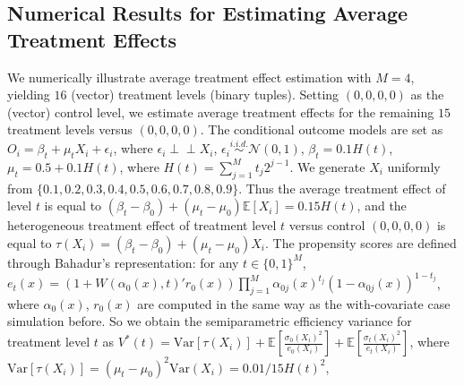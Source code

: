 \documentclass[11pt]{article}
\newcommand{\indep}{\perp\!\!\!\perp}
\begin{document}
\subsection{Numerical Results for Estimating Average Treatment Effects}\label{appendix:ATE:numerical}
We numerically illustrate average treatment effect estimation with $M=4$, yielding $16$ (vector) treatment levels (binary tuples). Setting $(0,0,0,0)$ as the (vector) control level, we estimate average treatment effects for the remaining $15$ treatment levels versus $(0,0,0,0)$. The conditional outcome models are set as $O_i=\beta_t+\mu_t X_i+\epsilon_i$, where $\epsilon_i\indep X_i$, $\epsilon_i\overset{i.i.d.}{\sim}\mathcal{N}(0,1)$, $\beta_t=0.1H(t)$, $\mu_t=0.5+0.1H(t)$, where $H(t)=\sum_{j=1}^Mt_j2^{j-1}$. We generate $X_i$ uniformly from $\{0.1,0.2,0.3,0.4,0.5,0.6,0.7,0.8,0.9\}$.
Thus the average treatment effect of level $t$ is equal to $(\beta_t-\beta_0)+(\mu_t-\mu_0)\mathbb{E}[X_i]=0.15H(t)$, and the heterogeneous treatment effect of treatment level $t$ versus control $(0,0,0,0)$ is equal to $\tau(X_i)=(\beta_t-\beta_0)+(\mu_t-\mu_0)X_i$. The propensity scores are defined through Bahadur's representation: for any $t\in\{0,1\}^M$, $e_t(x)=(1+W(\alpha_0(x),t)'r_0(x))\prod_{j=1}^M\alpha_{0j}(x)^{t_j}(1-\alpha_{0j}(x))^{1-t_j}$, where $\alpha_{0}(x)$, $r_0(x)$ are computed in the same way as the with-covariate case simulation before. So we obtain the semiparametric efficiency variance for treatment level $t$ as $V^*(t)=\mathrm{Var}[\tau(X_i)]+\mathbb{E}\left[\frac{\sigma_0(X_i)^2}{e_{0}(X_i)}\right]+\mathbb{E}\left[\frac{\sigma_t(X_i)^2}{e_t(X_i)}\right]$, where $\mathrm{Var}[\tau(X_i)]=(\mu_t-\mu_0)^2\mathrm{Var}(X_i)=0.01/15H(t)^2$,
\end{document}
